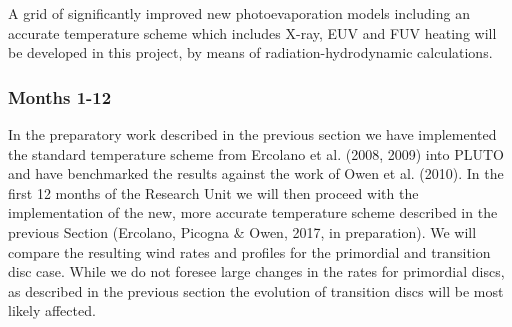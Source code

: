 \documentclass[10pt,fleqn,twoside]{article}
\begin{document}

A grid of significantly improved new photoevaporation models including
an accurate temperature scheme which includes X-ray, EUV and FUV
heating will be developed in this project, by means of
radiation-hydrodynamic calculations. 






\subsubsection{Months 1-12}
In the preparatory work described in the previous section we have
implemented the standard temperature scheme from Ercolano et
al. (2008, 2009) into PLUTO and have benchmarked the results against
the work of Owen et al. (2010). In the first 12 months of the Research
Unit we will then proceed with the implementation of the new, more accurate
temperature scheme described in the previous Section (Ercolano,
Picogna \& Owen, 2017, in preparation). We will compare the resulting
wind rates and profiles for the primordial and transition disc
case. While we do not foresee large changes in the rates for
primordial discs, as described in the previous section the evolution of transition discs will be most
likely affected. 
\end{document}
